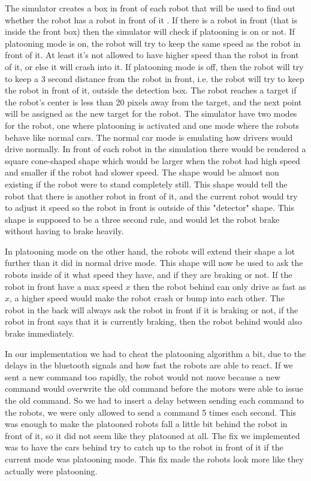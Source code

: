The simulator creates a box in front of each robot that will be used to find out whether the robot has a robot in front of it . If there is a robot in front (that is inside the front box) then the simulator will check if platooning is on or not. If platooning mode is on, the robot will try to keep the same speed as the robot in front of it. At least it's not allowed to have higher speed than the robot in front of it, or else it will crash into it. If platooning mode is off, then the robot will try to keep a 3 second distance from the robot in front, i.e. the robot will try to keep the robot in front of it, outside the detection box. The robot reaches a target if the robot's center is less than 20 pixels away from the target, and the next point will be assigned as the new target for the robot.
The simulator have two modes for the robot, one where platooning is activated and one mode where the robots behave like normal cars. The normal car mode is emulating how drivers would drive normally. In front of each robot in the simulation there would be rendered a square cone-shaped shape which would be larger when the robot had high speed and smaller if the robot had slower speed. The shape would be almost non existing if the robot were to stand completely still. This shape would tell the robot that there is another robot in front of it, and the current robot would try to adjust it speed so the robot in front is outside of this "detector" shape. This shape is supposed to be a three second rule, and would let the robot brake without having to brake heavily.

In platooning mode on the other hand, the robots will extend their shape a lot further than it did in normal drive mode. This shape will now be used to ask the robots inside of it what speed they have, and if they are braking or not.
If the robot in front have a max speed $x$ then the robot behind can only drive as fast as $x$, a higher speed would make the robot crash or bump into each other.
The robot in the back will always ask the robot in front if it is braking or not, if the robot in front says that it is currently braking, then the robot behind would also brake immediately.

In our implementation we had to cheat the platooning algorithm a bit, due to the delays in the bluetooth signals and how fast the robots are able to react. If we sent a new command too rapidly, the robot would not move because a new command would overwrite the old command before the motors were able to issue the old command. So we had to insert a delay between sending each command to the robots, we were only allowed to send a command 5 times each second. This was enough to make the platooned robots fall a little bit behind the robot in front of it, so it did not seem like they platooned at all. The fix we implemented was to have the cars behind try to catch up to the robot in front of it if the current mode was platooning mode. This fix made the robots look more like they actually were platooning.

